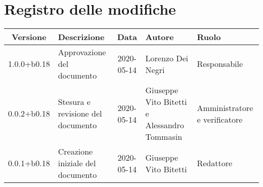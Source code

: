 \section*{Registro delle modifiche}

\begin{center}
	\begin{longtable}{|c|p{3.5cm}|c|p{3cm}|p{3cm}|}
	\hline
	\rowcolor{lighter-grayer}
	\textbf{Versione} & \textbf{Descrizione} & \textbf{Data} & \textbf{Autore} & \textbf{Ruolo} \\
	\hline
	\endfirsthead

	1.0.0+b0.18 & Approvazione del documento & 2020-05-14 & Lorenzo Dei Negri & Responsabile \\
	\hline
	0.0.2+b0.18 & Stesura e revisione del documento & 2020-05-14 & Giuseppe Vito Bitetti e Alessandro Tommasin & Amministratore e verificatore \\
	\hline
	0.0.1+b0.18 & Creazione iniziale del documento & 2020-05-14 & Giuseppe Vito Bitetti & Redattore \\
	\hline

	\end{longtable}
\end{center}
